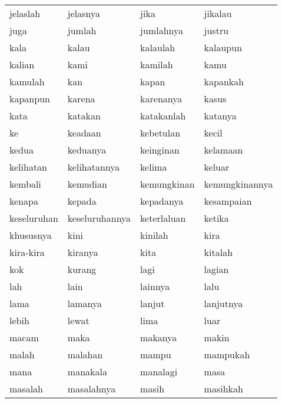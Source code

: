 \begin{tabular}{ | l | l | l | l | }
jelaslah & jelasnya & jika & jikalau\\
juga & jumlah & jumlahnya & justru\\
kala & kalau & kalaulah & kalaupun\\
kalian & kami & kamilah & kamu\\
kamulah & kan & kapan & kapankah\\
kapanpun & karena & karenanya & kasus\\
kata & katakan & katakanlah & katanya\\
ke & keadaan & kebetulan & kecil\\
kedua & keduanya & keinginan & kelamaan\\
kelihatan & kelihatannya & kelima & keluar\\
kembali & kemudian & kemungkinan & kemungkinannya\\
kenapa & kepada & kepadanya & kesampaian\\
keseluruhan & keseluruhannya & keterlaluan & ketika\\
khususnya & kini & kinilah & kira\\
kira-kira & kiranya & kita & kitalah\\
kok & kurang & lagi & lagian\\
lah & lain & lainnya & lalu\\
lama & lamanya & lanjut & lanjutnya\\
lebih & lewat & lima & luar\\
macam & maka & makanya & makin\\
malah & malahan & mampu & mampukah\\
mana & manakala & manalagi & masa\\
masalah & masalahnya & masih & masihkah\\
\end{tabular}


